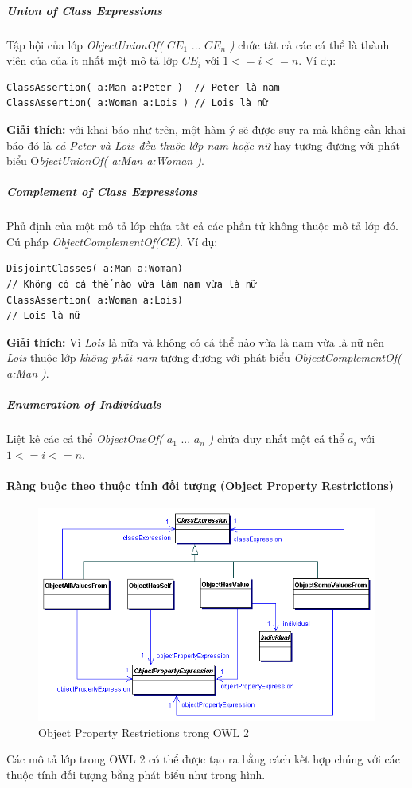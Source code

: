 \subparagraph{Union of Class Expressions} Tập hội của lớp \textit{ObjectUnionOf(} $CE_{1}$ ... $CE_{n}$ \textit{)} chức tất cả các cá thể là thành viên của của ít nhất một mô tả lớp $CE_{i}$ với $1<=i<=n$. Ví dụ:
\begin{verbatim}
ClassAssertion( a:Man a:Peter )	 // Peter là nam
ClassAssertion( a:Woman a:Lois ) // Lois là nữ
\end{verbatim}
\textbf{Giải thích: } với khai báo như trên, một hàm ý sẽ được suy ra mà không cần khai báo đó là \textit{cả Peter và Lois đều thuộc lớp nam hoặc nữ} hay tương đương với phát biểu O\textit{bjectUnionOf( a:Man a:Woman )}.

\subparagraph{Complement of Class Expressions} Phủ định của một mô tả lớp chứa tất cả các phần tử không thuộc mô tả lớp đó. Cú pháp \textit{ObjectComplementOf(CE)}. Ví dụ:
\begin{verbatim}
DisjointClasses( a:Man a:Woman) 
// Không có cá thể nào vừa làm nam vừa là nữ
ClassAssertion( a:Woman a:Lois) 
// Lois là nữ
\end{verbatim}
\textbf{Giải thích:} Vì \textit{Lois} là nữa và không có cá thể nào vừa là nam vừa là nữ nên \textit{Lois} thuộc lớp \textit{không phải nam} tương đương với phát biểu \textit{ObjectComplementOf( a:Man )}.

\subparagraph{Enumeration of Individuals} Liệt kê các cá thể \textit{ObjectOneOf(} $a_{1}$ ... $a_{n}$ \textit{)} chứa duy nhất một cá thể $a_{i}$ với $1<=i<=n$. 

\paragraph{Ràng buộc theo thuộc tính đối tượng (Object Property Restrictions)}
\begin{figure}[h]
	\centering
	\includegraphics[width=150mm]{Figures/ce_1.png}
	\caption{Object Property Restrictions trong OWL 2\label{overflow}}
\end{figure}
Các mô tả lớp trong OWL 2 có thể được tạo ra bằng cách kết hợp chúng với các thuộc tính đối tượng bằng phát biểu như trong hình.
